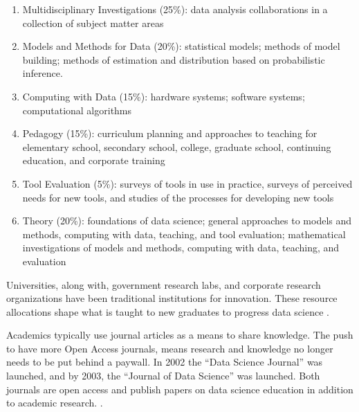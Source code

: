 \documentclass[010-intro.tex]{subfiles}
\begin{document}
    \begin{enumerate}
        \item Multidisciplinary Investigations (25\%):
            data analysis collaborations in a collection of subject matter areas
        \item Models and Methods for Data (20\%):
            statistical models;
            methods of model building;
            methods of estimation and distribution based on probabilistic inference.
        \item Computing with Data (15\%):
            hardware systems;
            software systems;
            computational algorithms
        \item Pedagogy (15\%):
            curriculum planning and approaches to teaching for
            elementary school, secondary school, college, graduate school,
            continuing education, and corporate training
        \item Tool Evaluation (5\%):
            surveys of tools in use in practice,
            surveys of perceived needs for new tools,
            and studies of the processes for developing new tools
        \item Theory (20\%):
            foundations of data science;
            general approaches to models and methods, computing with data, teaching, and tool evaluation;
            mathematical investigations of models and methods, computing with data, teaching, and evaluation
    \end{enumerate}

    Universities, along with, government research labs, and corporate research organizations
    have been traditional institutions for innovation.
    These resource allocations shape what is taught to new graduates to progress data science
    \cite{clevelandDataScienceAction2001}.

    Academics typically use journal articles as a means to share knowledge.
    The push to have more Open Access journals, means research and knowledge no longer needs to be put
    behind a paywall.
    In 2002 the ``Data Science Journal'' was launched,
    and by 2003, the ``Journal of Data Science'' was launched.
    Both journals are open access and publish papers on data science education in addition to academic research.
    \cite{DataScienceJournal, JournalDataScience}.
\end{document}
